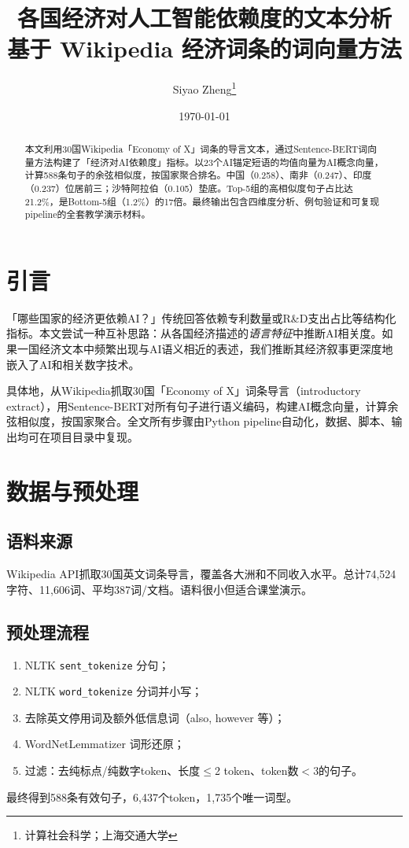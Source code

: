 \documentclass[11pt,a4paper]{article}
\title{\textbf{各国经济对人工智能依赖度的文本分析}\\[4pt]\large 基于 Wikipedia 经济词条的词向量方法}
\author{Siyao Zheng\thanks{计算社会科学；上海交通大学}}
\date{\today}
\begin{document}
\maketitle

\begin{abstract}
\noindent 本文利用30国Wikipedia「Economy of X」词条的导言文本，通过Sentence-BERT词向量方法构建了「经济对AI依赖度」指标。以23个AI锚定短语的均值向量为AI概念向量，计算588条句子的余弦相似度，按国家聚合排名。中国（0.258）、南非（0.247）、印度（0.237）位居前三；沙特阿拉伯（0.105）垫底。Top-5组的高相似度句子占比达21.2\%，是Bottom-5组（1.2\%）的17倍。最终输出包含四维度分析、例句验证和可复现pipeline的全套教学演示材料。
\end{abstract}

\section{引言}

「哪些国家的经济更依赖AI？」传统回答依赖专利数量或R\&D支出占比等结构化指标。本文尝试一种互补思路：从各国经济描述的\emph{语言特征}中推断AI相关度。如果一国经济文本中频繁出现与AI语义相近的表述，我们推断其经济叙事更深度地嵌入了AI和相关数字技术。

具体地，从Wikipedia抓取30国「Economy of X」词条导言（introductory extract），用Sentence-BERT对所有句子进行语义编码，构建AI概念向量，计算余弦相似度，按国家聚合。全文所有步骤由Python pipeline自动化，数据、脚本、输出均可在项目目录中复现。

\section{数据与预处理}

\subsection{语料来源}
Wikipedia API抓取30国英文词条导言，覆盖各大洲和不同收入水平。总计74,524字符、11,606词、平均387词/文档。语料很小但适合课堂演示。

\subsection{预处理流程}
\begin{enumerate}[nosep]
\item NLTK \texttt{sent\_tokenize} 分句；
\item NLTK \texttt{word\_tokenize} 分词并小写；
\item 去除英文停用词及额外低信息词（also, however 等）；
\item WordNetLemmatizer 词形还原；
\item 过滤：去纯标点/纯数字token、长度$\le$2 token、token数$<$3的句子。
\end{enumerate}
最终得到588条有效句子，6,437个token，1,735个唯一词型。
\end{document}
